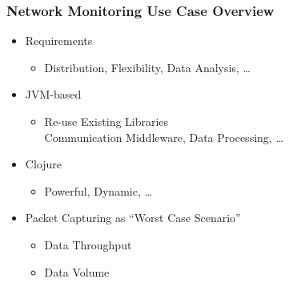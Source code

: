 \documentclass[aspectratio=169]{beamer}
\begin{document}
  \begin{frame}
    \frametitle{Network Monitoring Use Case Overview}

      \begin{itemize}
          \item Requirements
              \begin{itemize}
                  \item Distribution, Flexibility, Data Analysis, \ldots{}
              \end{itemize}
          \item JVM-based
               \begin{itemize}
                   \item Re-use Existing Libraries\\
                         Communication Middleware, Data Processing, \ldots{}
               \end{itemize}
           \item Clojure
               \begin{itemize}
                   \item Powerful, Dynamic, \ldots{}
               \end{itemize}
          \item Packet Capturing as ``Worst Case Scenario''
              \begin{itemize}
                  \item Data Throughput
                  \item Data Volume
              \end{itemize}
      \end{itemize}
  \end{frame}

%
\end{document}
